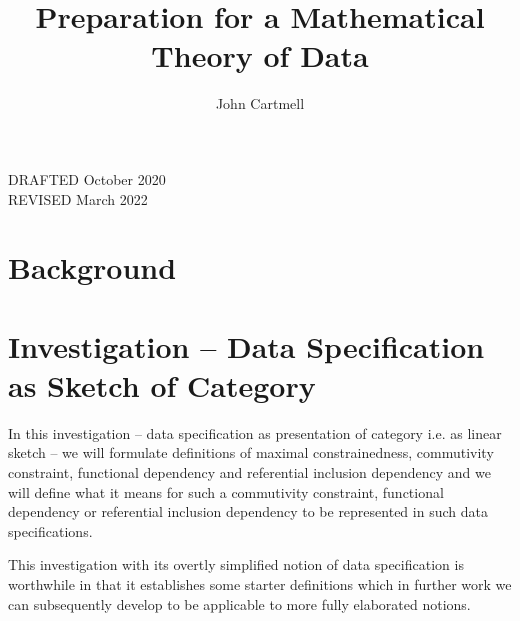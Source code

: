 \documentclass[10pt,a4paper]{article}
\theoremstyle{remark}
\begin{document}
\title{Preparation for a Mathematical Theory of Data}


\author{John Cartmell}

\date{}

\maketitle

\begin{center}
DRAFTED October 2020 \\
REVISED March 2022
\end{center}


\newcommand{\paralleldiag}[4]
{
 $
\rule[-0.3cm]{0pt}{0.9cm} %
\begin{array}{c p{0.5cm} c  }
 \Rnode{a}{#1}     &&   \Rnode{b}{#2}
\end{array} 
\begin{arrows}
\ncarc[nodesep=2pt,arcangle=10,offset=2pt]{->}{a}{b}
\alabel{#3}
\ncarc[nodesep=2pt,arcangle=-10,offset=-2pt]{->}{a}{b}
\blabel{#4}
\end{arrows}
$  
}

\section{Background}


\section{Investigation -- Data Specification as Sketch of Category}
\note
In this investigation -- data specification as presentation of category i.e. as linear sketch \cite{BarrandWells}-- we will formulate 
definitions of maximal constrainedness, commutivity constraint, functional dependency and referential inclusion dependency
and we will define what it means for such a commutivity constraint, functional dependency or  referential inclusion dependency to be represented in such data specifications.

\note
This investigation with its overtly simplified notion of data specification is worthwhile in that   it establishes some starter definitions which in further work we can subsequently develop to be applicable to more fully elaborated notions.
\end{document}
